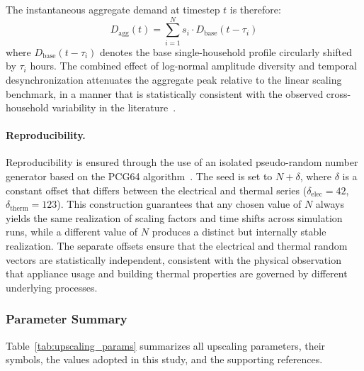 \documentclass[12pt,a4paper]{report}
\begin{document}
The instantaneous aggregate demand at timestep $t$ is therefore:
%
\begin{equation}
    D_{\mathrm{agg}}(t)
    = \sum_{i=1}^{N} s_i \cdot D_{\mathrm{base}}\!\left(t - \tau_i\right)
    \label{eq:agg_demand}
\end{equation}
%
where $D_{\mathrm{base}}(t - \tau_i)$ denotes the base single-household
profile circularly shifted by $\tau_i$ hours.
The combined effect of log-normal amplitude diversity and temporal
desynchronization attenuates the aggregate peak relative to the linear
scaling benchmark, in a manner that is statistically consistent with the
observed cross-household variability in the literature~\cite{dickert2010coincidence, vtt2018hierarchical}.

\paragraph{Reproducibility.}
Reproducibility is ensured through the use of an isolated pseudo-random
number generator based on the PCG64 algorithm~\cite{numpy2020rng}.
The seed is set to $N + \delta$, where $\delta$ is a constant offset that
differs between the electrical and thermal series
($\delta_{\mathrm{elec}} = 42$, $\delta_{\mathrm{therm}} = 123$).
This construction guarantees that any chosen value of $N$ always yields the
same realization of scaling factors and time shifts across simulation runs,
while a different value of $N$ produces a distinct but internally stable
realization.
The separate offsets ensure that the electrical and thermal random vectors
are statistically independent, consistent with the physical observation that
appliance usage and building thermal properties are governed by different
underlying processes.

\subsubsection{Parameter Summary}
\label{subsubsec:param_summary}

Table~\ref{tab:upscaling_params} summarizes all upscaling parameters, their
symbols, the values adopted in this study, and the supporting references.
\end{document}
